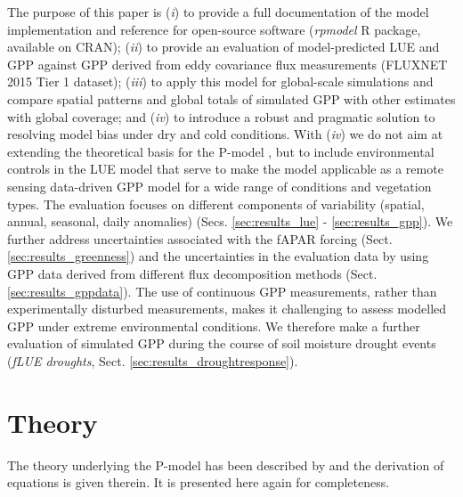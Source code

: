 \documentclass[gmd, manuscript]{copernicus}
\begin{document}
The purpose of this paper is (\textit{i}) to provide a full documentation of the model implementation and reference for open-source software (\textit{rpmodel} R package, available on CRAN); (\textit{ii}) to provide an evaluation of model-predicted LUE and GPP against GPP derived from eddy covariance flux measurements (FLUXNET 2015 Tier 1 dataset); (\textit{iii}) to apply this model for global-scale simulations and compare spatial patterns and global totals of simulated GPP with other estimates with global coverage; and (\textit{iv}) to introduce a robust and pragmatic solution to resolving model bias under dry and cold conditions. With (\textit{iv}) we do not aim at extending the theoretical basis for the P-model \citep{prentice14ecollett, wang17natpl}, but to include environmental controls in the LUE model that serve to make the model applicable as a remote sensing data-driven GPP model for a wide range of conditions and vegetation types. The evaluation focuses on different components of variability (spatial, annual, seasonal, daily anomalies) (Secs. \ref{sec:results_lue} - \ref{sec:results_gpp}). We further address uncertainties associated with the fAPAR forcing (Sect. \ref{sec:results_greenness}) and the uncertainties in the evaluation data by using GPP data derived from different flux decomposition methods (Sect. \ref{sec:results_gppdata}). The use of continuous GPP measurements, rather than experimentally disturbed measurements, makes it challenging to assess modelled GPP under extreme environmental conditions. We therefore make a further evaluation of simulated GPP during the course of soil moisture drought events (\textit{fLUE droughts}, Sect. \ref{sec:results_droughtresponse}).


\section{Theory}
\label{sec:theory}

The theory underlying the P-model has been described by \citet{wang17natpl} and the derivation of equations is given therein. It is presented here again for completeness.
\end{document}

